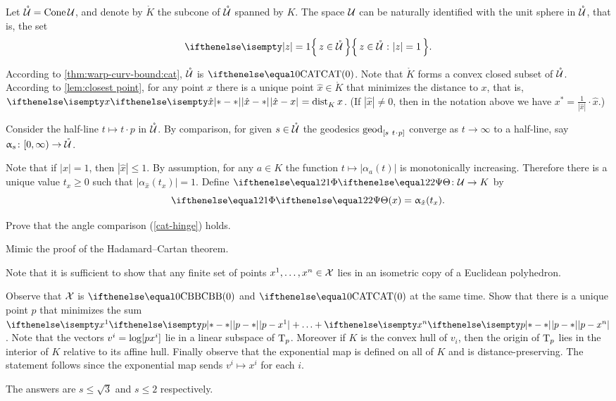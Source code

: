 Let $\mathring{\mathcal{U}}=\mathop{\rm Cone}\nolimits \mathcal{U}$, and 
denote by $\mathring{K}$ the subcone of $\mathring{\mathcal{U}}$ spanned by $K$.
The space $\mathcal{U}$ can be naturally identified with the unit sphere in $\mathring{\mathcal{U}}$, 
that is, the set 
\[\set{z\in \mathring{\spc{U}}}{|z|=1}.\]

According to \ref{thm:warp-curv-bound:cat}, $\mathring{\mathcal{U}}$ is $\CAT0$.
Note that $\mathring{K}$ forms a convex closed subset of $\mathring{\mathcal{U}}$.
According to \ref{lem:closest point}, for any point $x$ there is a unique point $\hat x\in \mathring{K}$
that minimizes the distance to $x$,
that is, $\dist{\hat x}{x}{}=\distfun{K}{x}{}$.
(If $|\hat x|\ne0$, then in the notation above we have
$x^*=\tfrac1{|\hat x|}\cdot\hat x$.)

Consider the half-line $t\mapsto t\cdot p$ in  $\mathring{\mathcal{U}}$.
By comparison, 
for given $s\in \mathring{\spc{U}}$
the geodesics $\geod_{[s\ t\cdot p]}$ converge as $t\to\infty$ to a half-line, 
say $\alpha_s\:[0,\infty)\to \mathring{\spc{U}}$.



Note that if $|x|=1$, then $|\hat x|\le 1$.
By assumption, for any $a\in K$ the function $t\mapsto |\alpha_a(t)|$ is monotonically increasing.
Therefore there is a unique value $t_x\ge 0$ such that
$|\alpha_{\hat x}(t_x)|=1$.
Define $\map[2]\:\spc{U}\to K$
 by 
\[\map[2](x)=\alpha_{\hat x}(t_x).\]

Prove that the angle comparison (\ref{cat-hinge}) holds.

Mimic the proof of the Hadamard--Cartan theorem.

Note that it is sufficient to show that any finite set of points $x^1,\dots,x^n\in\spc{X}$ lies in an isometric copy of a Euclidean polyhedron.

Observe that $\mathcal{X}$ is $\Alex0$ and $\CAT0$ at the same time.
Show that there is a unique point $p$ that minimizes the sum $\dist{p}{x^1}{}+\dots+\dist{p}{x^n}{}$.
Note that the vectors $v^i=\mathrm{log}[{p}{x^i}]$ lie in a linear subspace of $\text{\rm T}_p$.
Moreover if $K$ is the convex hull of $v_i$, then the origin of $\text{\rm T}_p$ lies in the interior of $K$ relative to its affine hull.
Finally observe that the exponential map is defined on all of $K$ and is distance-preserving.
The statement follows since the exponential map sends $v^i\mapsto x^i$ for each $i$.

The answers are $s\le \sqrt3$ and $s\le 2$ respectively.

